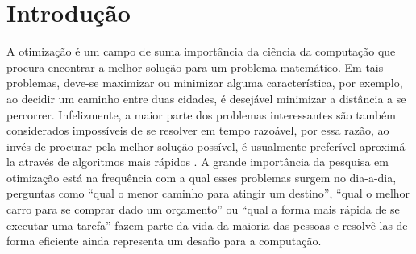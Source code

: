 \chapter[Introdução]{Introdução}

A otimização é um campo de suma importância da ciência da computação que procura encontrar a melhor solução para um problema matemático. Em tais problemas, deve-se maximizar ou minimizar alguma característica, por exemplo, ao decidir um caminho entre duas cidades, é desejável minimizar a distância a se percorrer. Infelizmente, a maior parte dos problemas interessantes são também considerados impossíveis de se resolver em tempo razoável, por essa razão, ao invés de procurar pela melhor solução possível, é usualmente preferível aproximá-la através de algoritmos mais rápidos \cite{GreedyAlgorithms}. A grande importância da pesquisa em otimização está na frequência com a qual esses problemas surgem no dia-a-dia, perguntas como ``qual o menor caminho para atingir um destino'', ``qual o melhor carro para se comprar dado um orçamento'' ou ``qual a forma mais rápida de se executar uma tarefa'' fazem parte da vida da maioria das pessoas e resolvê-las de forma eficiente ainda representa um desafio para a computação.

